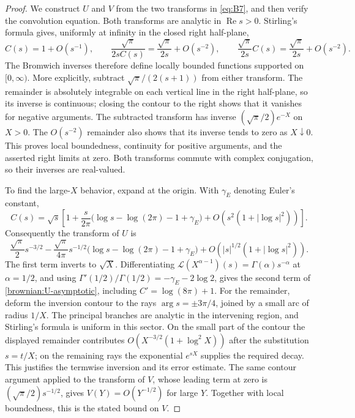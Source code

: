 \begin{proof}
We construct $U$ and $V$ from the two transforms in \eqref{eq:B7}, and
then verify the convolution equation.  Both transforms are analytic in
$\operatorname{Re}s>0$.  Stirling's formula gives, uniformly at infinity
in the closed right half-plane,
\[
 C(s)=1+O(s^{-1}),\qquad
 \frac{\sqrt\pi}{2sC(s)}=
 \frac{\sqrt\pi}{2s}+O(s^{-2}),\qquad
 \frac{\sqrt\pi}{2s}C(s)=
 \frac{\sqrt\pi}{2s}+O(s^{-2}).
\]
The Bromwich inverses therefore define locally bounded functions
supported on $[0,\infty)$.  More explicitly, subtract
$\sqrt\pi/(2(s+1))$ from either transform.  The remainder is absolutely
integrable on each vertical line in the right half-plane, so its inverse
is continuous; closing the contour to the right shows that it vanishes
for negative arguments.  The subtracted transform has inverse
$(\sqrt\pi/2)e^{-X}$ on $X>0$.  The $O(s^{-2})$ remainder also shows
that its inverse tends to zero as $X\downarrow0$.  This proves local
boundedness, continuity for positive arguments, and the asserted
right limits at zero.
Both transforms commute with complex conjugation, so their inverses
are real-valued.

To find the large-$X$ behavior, expand at the origin.  With
$\gamma_E$ denoting Euler's constant,
\[
 C(s)=\sqrt{s}\left[
 1+\frac{s}{2\pi}
       \bigl(\log s-\log(2\pi)-1+\gamma_E\bigr)
 +O\!\left(s^2(1+|\log s|^2)\right)\right].
\]
Consequently the transform of $U$ is
\[
 \frac{\sqrt\pi}{2}s^{-3/2}
 -\frac{\sqrt\pi}{4\pi}s^{-1/2}
       \bigl(\log s-\log(2\pi)-1+\gamma_E\bigr)
 +O\!\left(|s|^{1/2}(1+|\log s|^2)\right).
\]
The first term inverts to $\sqrt X$.  Differentiating
$\mathcal L(X^{\alpha-1})(s)=\Gamma(\alpha)s^{-\alpha}$ at
$\alpha=1/2$, and using
$\Gamma'(1/2)/\Gamma(1/2)=-\gamma_E-2\log2$, gives the second term
of \eqref{brownian:U-asymptotic}, including $C'=\log(8\pi)+1$.
For the remainder, deform the inversion contour to the rays
$\arg s=\pm3\pi/4$, joined by a small arc of radius $1/X$.
The principal branches are analytic in the intervening region, and
Stirling's formula is uniform in this sector.  On the small part of
the contour the displayed remainder contributes
$O(X^{-3/2}(1+\log^2X))$ after the substitution $s=t/X$;
on the remaining rays the exponential $e^{sX}$ supplies the required
decay.  This justifies the termwise inversion and its error estimate.
The same contour argument applied to the transform of $V$, whose
leading term at zero is $(\sqrt\pi/2)s^{-1/2}$, gives
$V(Y)=O(Y^{-1/2})$ for large $Y$.  Together with local boundedness,
this is the stated bound on $V$.


\end{proof}
